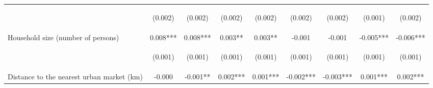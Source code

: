 \begin{center}
\begin{tabular}{lcccccccc}
\vspace{4pt} & \begin{footnotesize}(0.002)\end{footnotesize} & \begin{footnotesize}(0.002)\end{footnotesize} & \begin{footnotesize}(0.002)\end{footnotesize} & \begin{footnotesize}(0.002)\end{footnotesize} & \begin{footnotesize}(0.002)\end{footnotesize} & \begin{footnotesize}(0.002)\end{footnotesize} & \begin{footnotesize}(0.001)\end{footnotesize} & \begin{footnotesize}(0.002)\end{footnotesize} \\
Household size (number of persons) & 0.008*** & 0.008*** & 0.003** & 0.003** & -0.001 & -0.001 & -0.005*** & -0.006*** \\
\vspace{4pt} & \begin{footnotesize}(0.001)\end{footnotesize} & \begin{footnotesize}(0.001)\end{footnotesize} & \begin{footnotesize}(0.001)\end{footnotesize} & \begin{footnotesize}(0.001)\end{footnotesize} & \begin{footnotesize}(0.001)\end{footnotesize} & \begin{footnotesize}(0.001)\end{footnotesize} & \begin{footnotesize}(0.001)\end{footnotesize} & \begin{footnotesize}(0.001)\end{footnotesize} \\
Distance to the nearest urban market (km) & -0.000 & -0.001** & 0.002*** & 0.001*** & -0.002*** & -0.003*** & 0.001*** & 0.002*** \\

\end{tabular}
\end{center}
